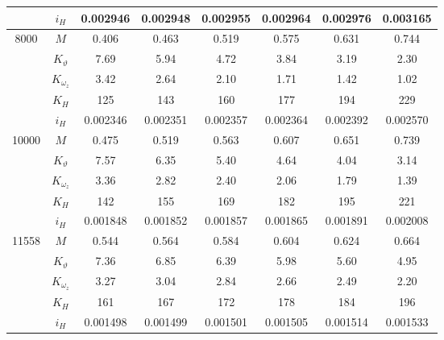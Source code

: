 \begin{tabular}{|c|c|c|c|c|c|c|c|}
      & $i_H$ &  0.002946 &  0.002948 &  0.002955 &  0.002964 &  0.002976 &  0.003165 \\\hline
8000 & $M$ &     0.406 &     0.463 &     0.519 &     0.575 &     0.631 &     0.744 \\
      & $K_\vartheta$ &      7.69 &      5.94 &      4.72 &      3.84 &      3.19 &      2.30 \\
      & $K_{\omega_z}$ &      3.42 &      2.64 &      2.10 &      1.71 &      1.42 &      1.02 \\
      & $K_H$ &       125 &       143 &       160 &       177 &       194 &       229 \\
      & $i_H$ &  0.002346 &  0.002351 &  0.002357 &  0.002364 &  0.002392 &  0.002570 \\\hline
10000 & $M$ &     0.475 &     0.519 &     0.563 &     0.607 &     0.651 &     0.739 \\
      & $K_\vartheta$ &      7.57 &      6.35 &      5.40 &      4.64 &      4.04 &      3.14 \\
      & $K_{\omega_z}$ &      3.36 &      2.82 &      2.40 &      2.06 &      1.79 &      1.39 \\
      & $K_H$ &       142 &       155 &       169 &       182 &       195 &       221 \\
      & $i_H$ &  0.001848 &  0.001852 &  0.001857 &  0.001865 &  0.001891 &  0.002008 \\\hline
11558 & $M$ &     0.544 &     0.564 &     0.584 &     0.604 &     0.624 &     0.664 \\
      & $K_\vartheta$ &      7.36 &      6.85 &      6.39 &      5.98 &      5.60 &      4.95 \\
      & $K_{\omega_z}$ &      3.27 &      3.04 &      2.84 &      2.66 &      2.49 &      2.20 \\
      & $K_H$ &       161 &       167 &       172 &       178 &       184 &       196 \\
      & $i_H$ &  0.001498 &  0.001499 &  0.001501 &  0.001505 &  0.001514 &  0.001533 \\
\hline
\end{tabular}